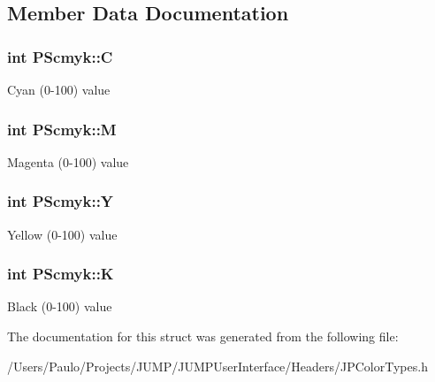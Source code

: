 \subsection{Member Data Documentation}
\hypertarget{struct_p_scmyk_a39bf406978a973d7d355fffeadb90790}{
\subsubsection[{C}]{\setlength{\rightskip}{0pt plus 5cm}int {\bf PScmyk::C}}}
\label{struct_p_scmyk_a39bf406978a973d7d355fffeadb90790}
Cyan (0-\/100) value \hypertarget{struct_p_scmyk_a066376df21d88a3573fba8d4f222e347}{
\subsubsection[{M}]{\setlength{\rightskip}{0pt plus 5cm}int {\bf PScmyk::M}}}
\label{struct_p_scmyk_a066376df21d88a3573fba8d4f222e347}
Magenta (0-\/100) value \hypertarget{struct_p_scmyk_a05cffa82f24c76cb1e9da6aced7556fa}{
\subsubsection[{Y}]{\setlength{\rightskip}{0pt plus 5cm}int {\bf PScmyk::Y}}}
\label{struct_p_scmyk_a05cffa82f24c76cb1e9da6aced7556fa}
Yellow (0-\/100) value \hypertarget{struct_p_scmyk_a06b48591efdd3cea844e1bc2f1cbd180}{
\subsubsection[{K}]{\setlength{\rightskip}{0pt plus 5cm}int {\bf PScmyk::K}}}
\label{struct_p_scmyk_a06b48591efdd3cea844e1bc2f1cbd180}
Black (0-\/100) value 

The documentation for this struct was generated from the following file:\begin{DoxyCompactItemize}
\item 
/Users/Paulo/Projects/JUMP/JUMPUserInterface/Headers/JPColorTypes.h\end{DoxyCompactItemize}
